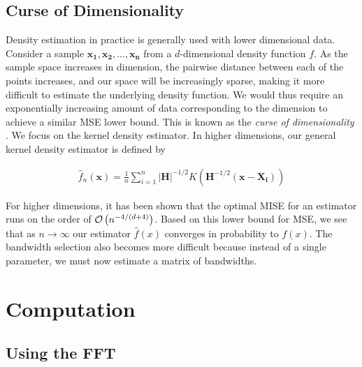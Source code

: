 \documentclass[12pt]{article}
\begin{document}
\subsection{Curse of Dimensionality}\label{curse-of-dimensionality}

Density estimation in practice is generally used with lower dimensional
data. Consider a sample
\(\mathbf{x_1},\mathbf{x_2}, \ldots, \mathbf{x_n}\) from a
\(d\)-dimensional density function \(f\). As the sample space increases
in dimension, the pairwise distance between each of the points
increases, and our space will be increasingly sparse, making it more
difficult to estimate the underlying density function. We would thus
require an exponentially increasing amount of data corresponding to the
dimension to achieve a similar MSE lower bound. This is known as the
\emph{curse of dimensionality} \citep{scott2015multivariate}. We focus
on the kernel density estimator. In higher dimensions, our general
kernel density estimator is defined by

\[
\begin{aligned}
\hat{f}_n(\mathbf{x}) = \frac{1}{n} \sum^{n}_{i=1}{|\mathbf{H}|^{-1/2}K\left(\mathbf{H}^{-1/2}(\mathbf{x} - \mathbf{X_i})\right)}
\end{aligned}
\]

For higher dimensions, it has been shown that the optimal MISE for an
estimator runs on the order of \(\mathcal{O}\left( n^{-4/(d+4)} \right)\). Based on this
lower bound for MSE, we see that as \(n\rightarrow \infty\) our
estimator \(\hat{f}(x)\) converges in probability to \(f(x)\). The
bandwidth selection also becomes more difficult because instead of a
single parameter, we must now estimate a matrix of bandwidths.

\section{Computation}\label{computation}

\subsection{Using the FFT}\label{using-the-fft}
\end{document}
